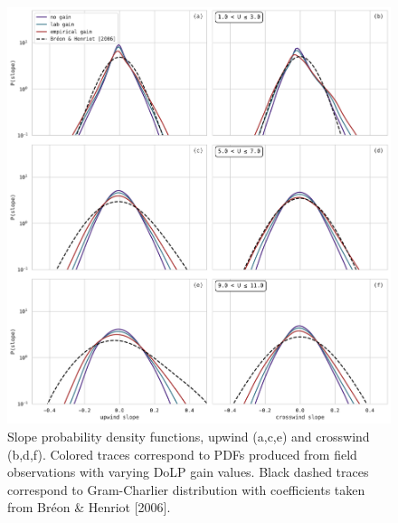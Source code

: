 \documentclass[letterpaper,journal]{IEEEtran}
\begin{document}
\begin{figure}[!ht]
    \centering
    \includegraphics[width=\textwidth]{_figures/slope_distributions_binned_by_wind.pdf}
    \vspace{-20pt}
\caption{Slope probability density functions, upwind (a,c,e) and crosswind (b,d,f). Colored traces correspond to PDFs produced from field observations with varying DoLP gain values. Black dashed traces correspond to Gram-Charlier distribution with coefficients taken from Br\'eon \& Henriot [2006].}
\label{fig:slope_distributions_binned_by_wind}
\end{figure}
\end{document}
